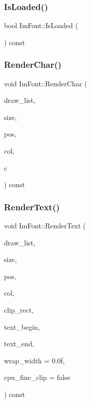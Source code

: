 \hypertarget{struct_im_font_a97dafa61cc94e84be396d69b0d42b1ce}{}\label{struct_im_font_a97dafa61cc94e84be396d69b0d42b1ce} 
\subsubsection{\texorpdfstring{Is\+Loaded()}{IsLoaded()}}
{\footnotesize\ttfamily bool Im\+Font\+::\+Is\+Loaded (\begin{DoxyParamCaption}{ }\end{DoxyParamCaption}) const}

\hypertarget{struct_im_font_af602fe8f445ae4142436ee3e6baa3ede}{}\label{struct_im_font_af602fe8f445ae4142436ee3e6baa3ede} 
\subsubsection{\texorpdfstring{Render\+Char()}{RenderChar()}}
{\footnotesize\ttfamily void Im\+Font\+::\+Render\+Char (\begin{DoxyParamCaption}\item[{\hyperlink{struct_im_draw_list}{Im\+Draw\+List} $\ast$}]{draw\+\_\+list,  }\item[{float}]{size,  }\item[{\hyperlink{struct_im_vec2}{Im\+Vec2}}]{pos,  }\item[{Im\+U32}]{col,  }\item[{unsigned short}]{c }\end{DoxyParamCaption}) const}

\hypertarget{struct_im_font_a2877acf1cfcd964bc2e7fe600a08849e}{}\label{struct_im_font_a2877acf1cfcd964bc2e7fe600a08849e} 
\subsubsection{\texorpdfstring{Render\+Text()}{RenderText()}}
{\footnotesize\ttfamily void Im\+Font\+::\+Render\+Text (\begin{DoxyParamCaption}\item[{\hyperlink{struct_im_draw_list}{Im\+Draw\+List} $\ast$}]{draw\+\_\+list,  }\item[{float}]{size,  }\item[{\hyperlink{struct_im_vec2}{Im\+Vec2}}]{pos,  }\item[{Im\+U32}]{col,  }\item[{const \hyperlink{struct_im_vec4}{Im\+Vec4} \&}]{clip\+\_\+rect,  }\item[{const char $\ast$}]{text\+\_\+begin,  }\item[{const char $\ast$}]{text\+\_\+end,  }\item[{float}]{wrap\+\_\+width = {\ttfamily 0.0f},  }\item[{bool}]{cpu\+\_\+fine\+\_\+clip = {\ttfamily false} }\end{DoxyParamCaption}) const}

